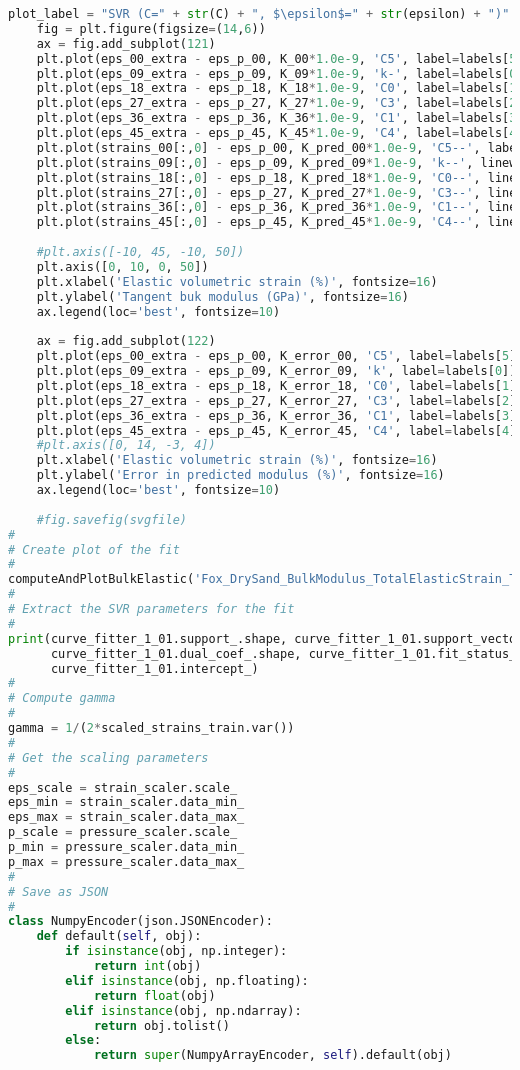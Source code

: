 \begin{lstlisting}[language=Python]
    plot_label = "SVR (C=" + str(C) + ", $\epsilon$=" + str(epsilon) + ")"
    fig = plt.figure(figsize=(14,6))
    ax = fig.add_subplot(121)
    plt.plot(eps_00_extra - eps_p_00, K_00*1.0e-9, 'C5', label=labels[5])
    plt.plot(eps_09_extra - eps_p_09, K_09*1.0e-9, 'k-', label=labels[0])
    plt.plot(eps_18_extra - eps_p_18, K_18*1.0e-9, 'C0', label=labels[1])
    plt.plot(eps_27_extra - eps_p_27, K_27*1.0e-9, 'C3', label=labels[2])
    plt.plot(eps_36_extra - eps_p_36, K_36*1.0e-9, 'C1', label=labels[3])
    plt.plot(eps_45_extra - eps_p_45, K_45*1.0e-9, 'C4', label=labels[4])
    plt.plot(strains_00[:,0] - eps_p_00, K_pred_00*1.0e-9, 'C5--', label=plot_label, linewidth=2)
    plt.plot(strains_09[:,0] - eps_p_09, K_pred_09*1.0e-9, 'k--', linewidth=2)
    plt.plot(strains_18[:,0] - eps_p_18, K_pred_18*1.0e-9, 'C0--', linewidth=2)
    plt.plot(strains_27[:,0] - eps_p_27, K_pred_27*1.0e-9, 'C3--', linewidth=2)
    plt.plot(strains_36[:,0] - eps_p_36, K_pred_36*1.0e-9, 'C1--', linewidth=2)
    plt.plot(strains_45[:,0] - eps_p_45, K_pred_45*1.0e-9, 'C4--', linewidth=2)
    
    #plt.axis([-10, 45, -10, 50])
    plt.axis([0, 10, 0, 50])
    plt.xlabel('Elastic volumetric strain (%)', fontsize=16)
    plt.ylabel('Tangent buk modulus (GPa)', fontsize=16)
    ax.legend(loc='best', fontsize=10)  
    
    ax = fig.add_subplot(122)
    plt.plot(eps_00_extra - eps_p_00, K_error_00, 'C5', label=labels[5])
    plt.plot(eps_09_extra - eps_p_09, K_error_09, 'k', label=labels[0])
    plt.plot(eps_18_extra - eps_p_18, K_error_18, 'C0', label=labels[1])
    plt.plot(eps_27_extra - eps_p_27, K_error_27, 'C3', label=labels[2])
    plt.plot(eps_36_extra - eps_p_36, K_error_36, 'C1', label=labels[3])
    plt.plot(eps_45_extra - eps_p_45, K_error_45, 'C4', label=labels[4])
    #plt.axis([0, 14, -3, 4])
    plt.xlabel('Elastic volumetric strain (%)', fontsize=16)
    plt.ylabel('Error in predicted modulus (%)', fontsize=16)
    ax.legend(loc='best', fontsize=10) 
    
    #fig.savefig(svgfile)
#
# Create plot of the fit
#
computeAndPlotBulkElastic('Fox_DrySand_BulkModulus_TotalElasticStrain_Tension_SVR_1_01_scaled_cv.svg', curve_fitter_1_01, 1, 0.01)
#
# Extract the SVR parameters for the fit
#
print(curve_fitter_1_01.support_.shape, curve_fitter_1_01.support_vectors_.shape,
      curve_fitter_1_01.dual_coef_.shape, curve_fitter_1_01.fit_status_,
      curve_fitter_1_01.intercept_)
#
# Compute gamma
#
gamma = 1/(2*scaled_strains_train.var())
#
# Get the scaling parameters
#
eps_scale = strain_scaler.scale_
eps_min = strain_scaler.data_min_
eps_max = strain_scaler.data_max_
p_scale = pressure_scaler.scale_
p_min = pressure_scaler.data_min_
p_max = pressure_scaler.data_max_
#
# Save as JSON
#
class NumpyEncoder(json.JSONEncoder):
    def default(self, obj):
        if isinstance(obj, np.integer):
            return int(obj)
        elif isinstance(obj, np.floating):
            return float(obj)
        elif isinstance(obj, np.ndarray):
            return obj.tolist()
        else:
            return super(NumpyArrayEncoder, self).default(obj)
        

\end{lstlisting}
